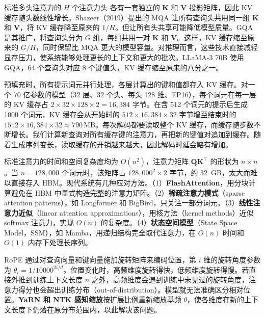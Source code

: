 \begin{interview}
标准多头注意力的 $H$ 个注意力头
各有一套独立的 $\mathbf{K}$ 和 $\mathbf{V}$ 投影矩阵，因此 KV 缓存随头数线性增长。Shazeer（2019）提出的 MQA 让所有查询头共用同一组 $\mathbf{K}$ 和 $\mathbf{V}$，将 KV 缓存降至原来的 $1/H$。但让所有头共享可能降低模型质量。GQA 是其推广，将查询头分为 $G$ 组，每组共用一对 $\mathbf{K}$ 和 $\mathbf{V}$。这样，KV 缓存缩至原来的 $G/H$，同时保留比 MQA 更大的模型容量。对推理而言，这些技术直接减轻显存压力，使系统能够处理更长的上下文和更大的批次。LLaMA-3 70B 使用 GQA，64 个查询头对应 8 个键值头，KV 缓存缩至原来的八分之一。


预填充时，所有提示词元并行处理，各层计算出的键和值都存入 KV 缓存。对一个 70 亿参数的模型（32 层、32 个头、每头 128 维、FP16），每个词元在每一层的 KV 缓存占 $2\times32\times128\times2=16{,}384$ 字节。在含 512 个词元的提示后生成 1000 个词元，KV 缓存会从开始时的 $512\times16{,}384\times32$ 字节增至结束时的 $1512\times16{,}384\times32\approx790\,\mathrm{MB}$。每次解码都要读取整个 KV 缓存，而缓存随步数不断增长。我们计算新查询对所有缓存键的注意力，再把新的键值对追加到缓存。随着生成序列变长，读取缓存的开销越来越大，因此解码时延会略有增加。

标准注意力的时间和空间复杂度均为 $O(n^2)$，注意力矩阵 $\mathbf{Q}\mathbf{K}^{\top}$ 的形状为 $n\times n$。当 $n=128{,}000$ 个词元时，该矩阵占 $128{,}000^2\times2$ 字节，约 32~GB，太大而难以直接存入 HBM。现代系统有几种应对方法。（1）\textbf{FlashAttention}，用分块计算避免在 HBM 中显式构造完整的注意力矩阵。（2）\textbf{稀疏注意力模式}（sparse attention patterns），如 Longformer 和 BigBird，只关注一部分词元。（3）\textbf{线性注意力近似}（linear attention approximations），用核方法（kernel methods）近似 softmax 注意力，实现 $O(n)$ 的复杂度。（4）\textbf{状态空间模型}（State Space Model，SSM），如 Mamba，用递归结构完全取代注意力，在 $O(n)$ 时间和 $O(1)$ 内存下处理长序列。

RoPE 通过对查询向量和键向量施加旋转矩阵来编码位置，第 $i$ 维的旋转角度参数为 $\theta_i=1/10000^{2i/d}$。位置变化时，高频维度旋转得快，低频维度旋转得慢。若直接外推到训练上下文长度 $n$ 之外，高频维度会遇到训练中未见过的旋转角度，注意力得分也会超出训练分布（out-of-distribution）。模型就无法准确区分相对位置。\textbf{YaRN 和 NTK 感知缩放}按扩展比例重新缩放基频 $\theta$，使各维度在新的上下文长度下仍落在原分布范围内，以此解决该问题。


\end{interview}
